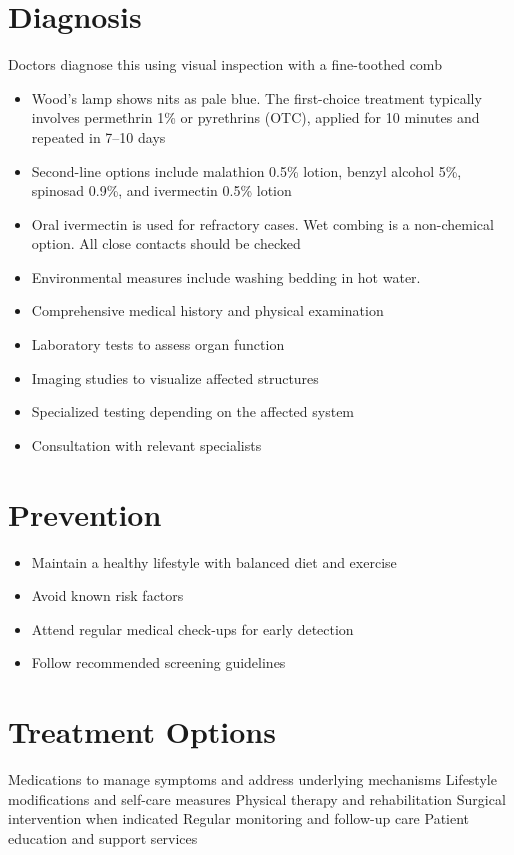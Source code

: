 \section{Diagnosis}
Doctors diagnose this using visual inspection with a fine-toothed comb

\begin{itemize}[noitemsep]
  \item Wood's lamp shows nits as pale blue. The first-choice treatment typically involves permethrin 1\% or pyrethrins (OTC), applied for 10 minutes and repeated in 7--10 days
  \item Second-line options include malathion 0.5\% lotion, benzyl alcohol 5\%, spinosad 0.9\%, and ivermectin 0.5\% lotion
  \item Oral ivermectin is used for refractory cases. Wet combing is a non-chemical option. All close contacts should be checked
  \item Environmental measures include washing bedding in hot water.
  \item Comprehensive medical history and physical examination
  \item Laboratory tests to assess organ function
  \item Imaging studies to visualize affected structures
  \item Specialized testing depending on the affected system
  \item Consultation with relevant specialists
\end{itemize}
\section{Prevention}
\begin{itemize}[noitemsep]
  \item Maintain a healthy lifestyle with balanced diet and exercise
  \item Avoid known risk factors
  \item Attend regular medical check-ups for early detection
  \item Follow recommended screening guidelines
\end{itemize}
\section{Treatment Options}
Medications to manage symptoms and address underlying mechanisms Lifestyle modifications and self-care measures Physical therapy and rehabilitation Surgical intervention when indicated Regular monitoring and follow-up care Patient education and support services

